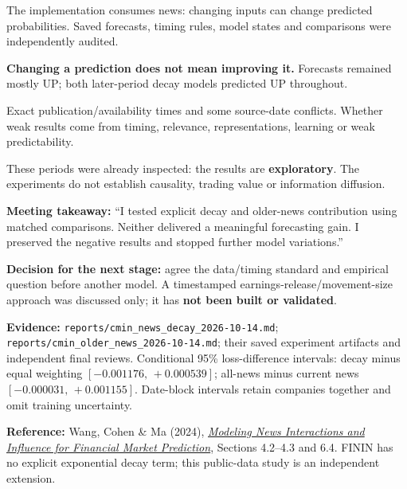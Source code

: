 \documentclass[10pt,a4paper,landscape]{article}
\newcommand{\sub}[1]{\vspace{3pt}{\large\bfseries\color{navy}#1}\par}
\newcommand{\caution}[1]{\par\colorbox{sand}{\parbox{\dimexpr\linewidth-2\fboxsep}{\vspace{4pt}#1\vspace{4pt}}}\par}
\begin{document}
\begin{minipage}[t]{.49\linewidth}
\sub{What is verified}
The implementation consumes news: changing inputs can change predicted probabilities. Saved forecasts, timing rules, model states and comparisons were independently audited.\par
\textbf{Changing a prediction does not mean improving it.} Forecasts remained mostly UP; both later-period decay models predicted UP throughout.
\end{minipage}\hfill
\begin{minipage}[t]{.47\linewidth}
\sub{What remains unresolved}
Exact publication/availability times and some source-date conflicts. Whether weak results come from timing, relevance, representations, learning or weak predictability.\par
These periods were already inspected: the results are \textbf{exploratory}. The experiments do not establish causality, trading value or information diffusion.
\end{minipage}

\caution{\textbf{Meeting takeaway:} ``I tested explicit decay and older-news contribution using matched comparisons. Neither delivered a meaningful forecasting gain. I preserved the negative results and stopped further model variations.''}
\textbf{Decision for the next stage:} agree the data/timing standard and empirical question before another model. A timestamped earnings-release/movement-size approach was discussed only; it has \textbf{not been built or validated}.

\vfill
{\scriptsize\color{slate}\textbf{Evidence:} \texttt{reports/cmin\_news\_decay\_2026-10-14.md}; \texttt{reports/cmin\_older\_news\_2026-10-14.md}; their saved experiment artifacts and independent final reviews. Conditional 95\% loss-difference intervals: decay minus equal weighting $[-0.001176,\,+0.000539]$; all-news minus current news $[-0.000031,\,+0.001155]$. Date-block intervals retain companies together and omit training uncertainty.}\par
{\scriptsize\color{slate}\textbf{Reference:} Wang, Cohen \& Ma (2024), \href{https://aclanthology.org/2024.findings-emnlp.189/}{\emph{Modeling News Interactions and Influence for Financial Market Prediction}}, Sections 4.2--4.3 and 6.4. FININ has no explicit exponential decay term; this public-data study is an independent extension.}
\end{document}
